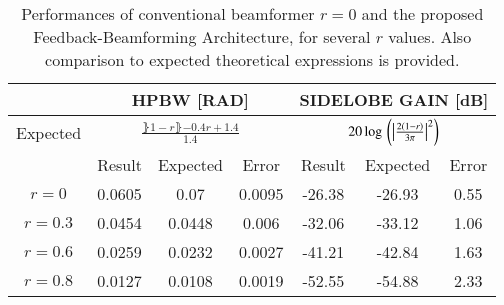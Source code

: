 \begin{table}[h!]
    \caption{Performances of conventional beamformer $r=0$ and the proposed Feedback-Beamforming Architecture, for several $r$ values.
    Also comparison to expected theoretical expressions is provided.}
    \centering
    {
        \begin{tabular}{||c | c c c | c c c||}
            \hline
            & \multicolumn{3}{c|}{HPBW [RAD]} & \multicolumn{3}{c||}{SIDELOBE GAIN [dB]} \\ [0.5ex]
            \hline
            Expected & \multicolumn{3}{c|}{$\frac{\rBrace{1-r}\rBrace{-0.4r+1.4}}{1.4}$} & \multicolumn{3}{c||}{$20\log{}\left({\left\vert\frac{2\left({1-r}\right)}{3\pi}\right\vert^{2}}\right)$} \\ [0.5ex]
            \hline
            & Result & Expected & Error & Result & Expected & Error \\ [0.5ex] 
            \hline\hline
            $r=0$ & 0.0605 & 0.07 & 0.0095 & -26.38 & -26.93 & 0.55 \\ [0.5ex]
            $r=0.3$ & 0.0454 & 0.0448 & 0.006 & -32.06 & -33.12 & 1.06 \\ [0.5ex]
            $r=0.6$ & 0.0259 & 0.0232 & 0.0027 & -41.21 & -42.84 & 1.63 \\ [0.5ex]
            $r=0.8$ & 0.0127 & 0.0108 & 0.0019 & -52.55 & -54.88 & 2.33 \\ [0.5ex]
            \hline
         \end{tabular}
     }
    \label{table_arrayPerfEmp}
\end{table}